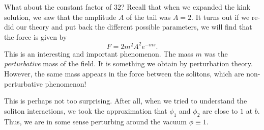 \documentclass[a4paper]{article}
\begin{document}
What about the constant factor of $32$? Recall that when we expanded the kink solution, we saw that the amplitude $A$ of the tail was $A = 2$. It turns out if we re-did our theory and put back the different possible parameters, we will find that the force is given by
\[
  F = 2 m^2 A^2 e^{-ms}.
\]
This is an interesting and important phenomenon. The mass $m$ was the \emph{perturbative} mass of the field. It is something we obtain by perturbation theory. However, the same mass appears in the force between the solitons, which are non-perturbative phenomenon!

This is perhaps not too surprising. After all, when we tried to understand the soliton interactions, we took the approximation that $\phi_1$ and $\phi_2$ are close to $1$ at $b$. Thus, we are in some sense perturbing around the vacuum $\phi \equiv 1$.

%
%
\end{document}

